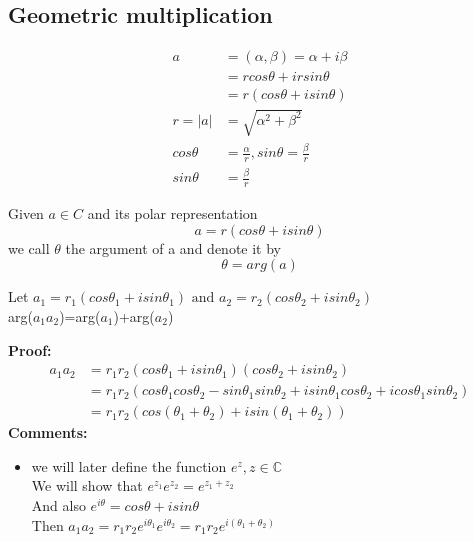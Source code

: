 \subsection{Geometric multiplication}
\begin{align*}{}{}
a&=(\alpha, \beta)=\alpha+i\beta\\
&=rcos\theta+irsin\theta\\
&=r(cos\theta+isin\theta)\\
r=|a|&=\sqrt{\alpha^2+\beta^2}\\
cos\theta&=\frac{\alpha}{r},sin\theta=\frac{\beta}{r}\\
sin\theta&=\frac{\beta}{r}
\end{align*}
\begin{definition}{}
Given $ a\in C $ and its polar representation$$
    a=r(cos\theta+isin\theta)
$$ 
we call $ \theta $ the argument of a and denote it by $$ \theta=arg(a) $$
\end{definition}
\begin{lemma}[]{}
Let $ a_1=r_1(cos\theta_1+isin\theta_1)\text{ and }a_2=r_2 (cos\theta_2+isin\theta_2)$ \\
arg($ a_1a_2 $)=arg($ a_1 $)+arg($ a_2 $)
\end{lemma}
\textbf{Proof:}
\begin{align*}{}{}
a_1a_2&=r_1r_2(cos\theta_1+isin\theta_1) (cos\theta_2+isin\theta_2)\\
&=r_1r_2(cos\theta_1cos\theta_2-sin\theta_1sin\theta_2+isin\theta_1cos\theta_2+icos\theta_1sin\theta_2)\\
&=r_1r_2(cos(\theta_1+\theta_2)+isin(\theta_1+\theta_2))
\end{align*}
\textbf{Comments:}
\begin{itemize}
\item we will later define the function $ e^z ,z\in \mathbb{C}$\\
We will show that $ e^{z_1}e^{z_2}=e^{z_1+z_2} $\\
And also $ e^{i\theta}=cos\theta+isin\theta $\\
Then $ a_1a_2=r_1r_2e^{i\theta_1}e^{i\theta_2}=r_1r_2e^{i(\theta_1+\theta_2)} $   
\end{itemize}
